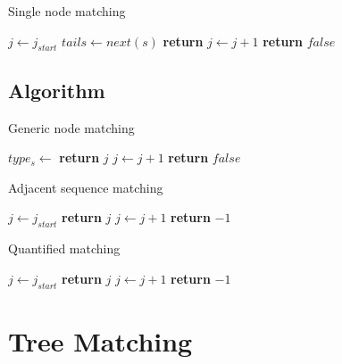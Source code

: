 \documentclass[11pt,a4paper]{report}
\begin{document}
\begin{algorithm}[H]
	\caption{Single node matching}
	\label{alg:match-node}
	\begin{algorithmic}[1]
		 
			\State $j \gets j_{start}$
					\State $tails \gets next(s)$
					\State \textbf{return} 
				\EndIf
				\State $j \gets j + 1$
			\EndWhile
			\State \textbf{return} $false$
		\EndProcedure
	\end{algorithmic}
\end{algorithm}

\section{Algorithm}
\label{sec:seq-alg}

\begin{algorithm}[H]
	\caption{Generic node matching}
	\label{alg:match}
	\begin{algorithmic}[1]
		 
			\State $type_s \gets$ 
			\State \textbf{return} $j$
			\EndIf
			\State $j \gets j + 1$
			\State \textbf{return} $false$
		\EndProcedure
	\end{algorithmic}
\end{algorithm}

\begin{algorithm}[H]
	\caption{Adjacent sequence matching}
	\label{alg:match-adjacent}
	\begin{algorithmic}[1]
		 
		\State $j \gets j_{start}$
		\State \textbf{return} $j$
		\EndIf
		\State $j \gets j + 1$
		\EndWhile
		\State \textbf{return} $-1$
		\EndProcedure
	\end{algorithmic}
\end{algorithm}

\begin{algorithm}[H]
	\caption{Quantified matching}
	\label{alg:match-quantified}
	\begin{algorithmic}[1]
		 
		\State $j \gets j_{start}$
		\State \textbf{return} $j$
		\EndIf
		\State $j \gets j + 1$
		\EndWhile
		\State \textbf{return} $-1$
		\EndProcedure
	\end{algorithmic}
\end{algorithm}



\chapter{Tree Matching}
\label{chap:tree-matching}

\begin{appendices}

\end{appendices}
\end{document}
